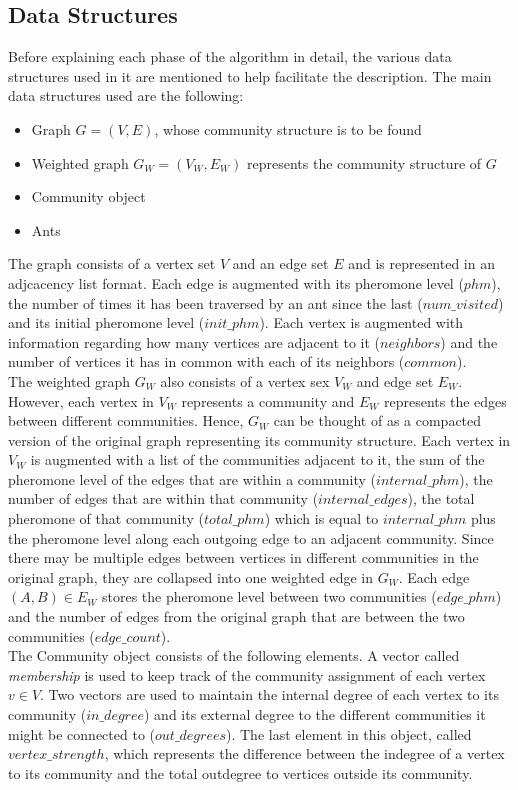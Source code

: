 \begin{spacing}{1.5}
\section{Data Structures}
Before explaining each phase of the algorithm in detail, the various data structures used in it are mentioned to help facilitate the description. The main data structures used are the following:
\begin{itemize}
	\item Graph $G=(V,E)$, whose community structure is to be found
	\item Weighted graph $G_W=(V_W, E_W)$ represents the community structure of $G$
	\item Community object
	\item Ants
\end{itemize} 
The graph consists of a vertex set $V$ and an edge set $E$ and is represented in an adjcacency list format. Each edge is augmented with its pheromone level ($phm$), the number of times it has been traversed by an ant since the last ($num\_visited$) and its initial pheromone level ($init\_phm$). Each vertex is augmented with information regarding how many vertices are adjacent to it ($neighbors$) and the number of vertices it has in common with each of its neighbors ($common$).\\
\indent The weighted graph $G_W$ also consists of a vertex sex $V_W$ and edge set $E_W$. However, each vertex in $V_W$ represents a community and $E_W$ represents the edges between different communities. Hence, $G_W$ can be thought of as a compacted version of the original graph representing its community structure. Each vertex in $V_W$ is augmented with a list of the communities adjacent to it, the sum of the pheromone level of the edges that are within a community ($internal\_phm$), the number of edges that are within that community ($internal\_edges$), the total pheromone of that community ($total\_phm$) which is equal to $internal\_phm$ plus the pheromone level along each outgoing edge to an adjacent community. Since there may be multiple edges between vertices in different communities in the original graph, they are collapsed into one weighted edge in $G_W$. Each edge $(A, B) \in E_W$ stores the pheromone level between two communities ($edge\_phm$) and the number of edges from the original graph that are between the two communities ($edge\_count$).\\
\indent The Community object consists of the following elements. A vector called \emph{membership} is used to keep track of the community assignment of each vertex $v \in V$. Two vectors are used to maintain the internal degree of each vertex to its community ($in\_degree$) and its external degree to the different communities it might be connected to ($out\_degrees$). The last element in this object, called $vertex\_strength$, which represents the difference between the indegree of a vertex to its community and the total outdegree to vertices outside its community.\\

\end{spacing}
